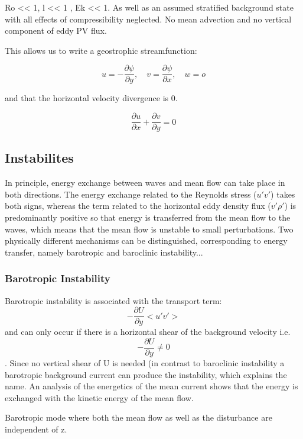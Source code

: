 Ro << 1, l << 1 , Ek << 1. As well as an assumed stratified background state with all effects of compressibility neglected. No mean advection and no vertical component of eddy PV flux.

This allows us to write a geostrophic streamfunction:

\begin{equation}
u=-\frac{\partial \psi}{\partial y}, \quad v=\frac{\partial \psi}{\partial x}, \quad w=o
\end{equation}

and that the horizontal velocity divergence is 0.


\begin{equation}
\frac{\partial u}{\partial x} + \frac{\partial v}{\partial y} =0
\end{equation}

\subsection{Instabilites}

In principle, energy exchange between waves and mean flow can take place in both directions. The energy exchange related to the Reynolds stress ($u'v'$) takes both signs, whereas the term related to the horizontal eddy density flux ($v'\rho '$) is predominantly positive so that energy is transferred from the mean flow
to the waves, which means that the mean flow is unstable to small perturbations. Two physically different mechanisms can be distinguished, corresponding to energy
transfer, namely barotropic and baroclinic instability...

\subsubsection{Barotropic Instability}

Barotropic instability is associated with the transport term: $$ -\frac{\partial U}{\partial y} <u'v'> $$ and can only occur if there is a horizontal shear of the background velocity i.e. $$ -\frac{\partial U}{\partial y}  \neq 0 $$. Since no vertical shear of U is needed (in contrast to baroclinic instability a barotropic background current can produce the instability, which explains the name. An analysis of the energetics of the mean current shows that the energy is exchanged with the kinetic energy of the mean flow.

Barotropic mode where both the mean flow as well as the disturbance are independent of z.

